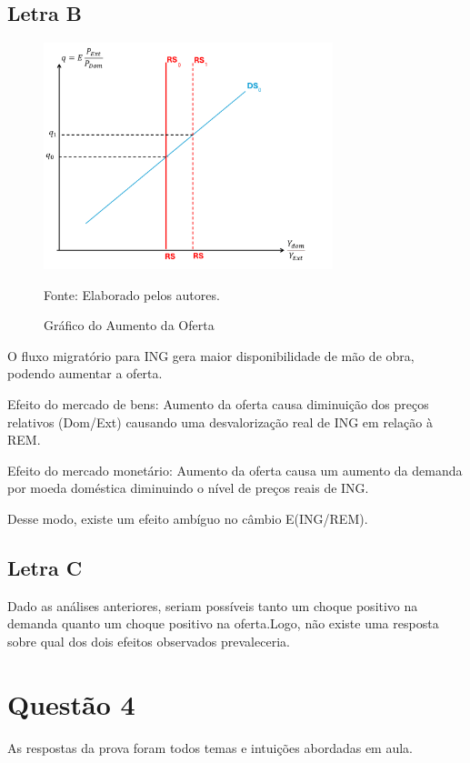 \documentclass[a4paper,12pt]{article}[abntex2]
\begin{document}
\subsection{\textbf{Letra B}}
\begin{figure}[H]
    \centering
    \caption{Gráfico do Aumento da Oferta} 
    \includegraphics[width=0.75\textwidth]{Macroeconomia Internacional/APS 3 Macro Int/Gráfico do Aumento da Oferta.png}
    \label{fig:aumentooferta}
    
    \footnotesize{Fonte: Elaborado pelos autores.}
    \end{figure}

O fluxo migratório para ING gera maior disponibilidade de mão de obra, podendo aumentar a oferta.

Efeito do mercado de bens: Aumento da oferta causa diminuição dos preços relativos (Dom/Ext) causando uma desvalorização real de ING em relação à REM.

Efeito do mercado monetário: Aumento da oferta causa um aumento da demanda por moeda doméstica diminuindo o nível de preços reais de ING.

Desse modo, existe um efeito ambíguo no câmbio E(ING/REM).
\subsection{\textbf{Letra C}}

Dado as análises anteriores, seriam possíveis tanto um choque positivo na demanda quanto um choque positivo na oferta.Logo, não existe uma resposta sobre qual dos dois efeitos observados prevaleceria. 

\section{\textbf{Questão 4}}
As respostas da prova foram todos temas e intuições abordadas em aula. 
\end{document}
